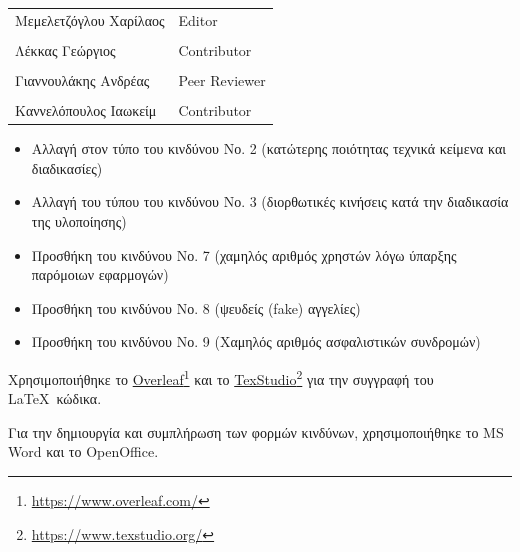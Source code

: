 \documentclass{../ol-softwaremanual}
\newcommand{\doclink}[2]{\href{#1}{#2}\footnote{\url{#1}}}
\begin{document}
	
	\vspace{20pt}
	
	\begin{table}[htbp!]
		\begin{tabular}{ll}
			Μεμελετζόγλου Χαρίλαος & \en Editor \\
			\\ Λέκκας Γεώργιος      &   \en  Contributor \\
			\\ Γιαννουλάκης Ανδρέας & \en Peer Reviewer \\
			\\ Καννελόπουλος Ιαωκείμ & \en Contributor \\ 
		\end{tabular}
	\end{table}

	\vspace{10pt}

	\begin{itemize}
		\item Αλλαγή στον τύπο του κινδύνου Νο. 2 (κατώτερης ποιότητας τεχνικά κείμενα και διαδικασίες)
		\item Αλλαγή του τύπου του κινδύνου Νο. 3 (διορθωτικές κινήσεις κατά την διαδικασία της υλοποίησης)
		\item Προσθήκη του κινδύνου Νο. 7 (χαμηλός αριθμός χρηστών λόγω ύπαρξης παρόμοιων εφαρμογών)
		\item Προσθήκη του κινδύνου Νο. 8 (ψευδείς \en (fake) \gr αγγελίες)
		\item Προσθήκη του κινδύνου Νο. 9 (Χαμηλός αριθμός ασφαλιστικών συνδρομών)
	\end{itemize}

	
	
	\vspace{20pt}
	
	
	\vspace{20pt}
	\flushleft
	Χρησιμοποιήθηκε το \en \doclink{https://www.overleaf.com/}{Overleaf} \gr και το \en \doclink{https://www.texstudio.org/}{TexStudio} \gr για την συγγραφή του \LaTeX\ κώδικα. \break
	
	Για την δημιουργία και συμπλήρωση των φορμών κινδύνων, χρησιμοποιήθηκε το \en MS Word \gr και το \en OpenOffice\gr.
	
	
	
\end{document}
